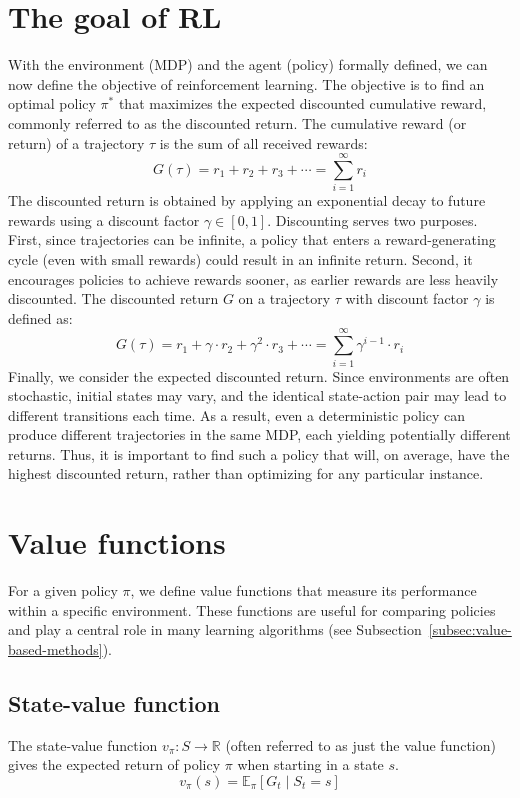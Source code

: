 \documentclass[
  digital,     %
  oneside,     %
  nosansbold,  %
  nocolorbold, %
  lof,         %
  lot,         %
]{fithesis4}
\begin{document}
\section{The goal of RL}
\label{sec:goal}
With the environment (MDP) and the agent (policy) formally defined, we can now define the objective of reinforcement learning. The objective is to find an optimal policy $\pi^*$ that maximizes the expected discounted cumulative reward, commonly referred to as the discounted return. The cumulative reward (or return) of a trajectory $\tau$ is the sum of all received rewards:
\begin{equation}
G(\tau) = r_1+r_2+r_3+\dotsb = \sum_{i=1}^{\infty} r_i
\end{equation}
The discounted return is obtained by applying an exponential decay to future rewards using a discount factor $\gamma \in [0,1]$. Discounting serves two purposes. First, since trajectories can be infinite, a policy that enters a reward-generating cycle (even with small rewards) could result in an infinite return. Second, it encourages policies to achieve rewards sooner, as earlier rewards are less heavily discounted. The discounted return $G$ on a trajectory $\tau$ with discount factor $\gamma$ is defined as:
\begin{equation}
G(\tau)=r_1+\gamma \cdot r_2+ \gamma^2 \cdot r_3+\dotsb = \sum_{i=1}^{\infty} \gamma^{i-1}\cdot r_{i}
\end{equation}
Finally, we consider the expected discounted return. Since environments are often stochastic, initial states may vary, and the identical state-action pair may lead to different transitions each time. As a result, even a deterministic policy can produce different trajectories in the same MDP, each yielding potentially different returns. Thus, it is important to find such a policy that will, on average, have the highest discounted return, rather than optimizing for any particular instance.

\section{Value functions}

For a given policy $\pi$, we define value functions that measure its performance within a specific environment. These functions are useful for comparing policies and play a central role in many learning algorithms (see Subsection~\ref{subsec:value-based-methods}).

\subsection{State-value function}
\label{subsec:state_value_func}
The state-value function $v_\pi\colon S\to \mathbb{R}$ (often referred to as just the value function) gives the expected return of policy $\pi$ when starting in a state $s$.
\begin{equation}
v_\pi(s) = \mathbb{E}_\pi [G_t\mid S_t=s]
\end{equation}
\end{document}

